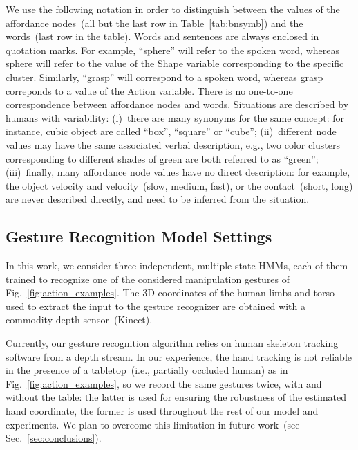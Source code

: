 We use the following notation in order to distinguish between the values of the affordance nodes~(all but the last row in Table~\ref{tab:bnsymb}) and the words~(last row in the table).
Words and sentences are always enclosed in quotation marks.
For example, ``sphere'' will refer to the spoken word, whereas sphere will refer to the value of the Shape variable corresponding to the specific cluster.
Similarly, ``grasp'' will correspond to a spoken word, whereas grasp correponds to a value of the Action variable.
There is no one-to-one correspondence between affordance nodes and words.
Situations are described by humans with variability:
(i)~there are many synonyms for the same concept: for instance, cubic object are called ``box'', ``square'' or ``cube'';
(ii)~different node values may have the same associated verbal description, e.g., two color clusters corresponding to different shades of green are both referred to as ``green'';
(iii)~finally, many affordance node values have no direct description: for example, the object velocity and \objecthand{} velocity~(slow, medium, fast), or the \objecthand{} contact~(short, long) are never described directly, and need to be inferred from the situation.

\subsection{Gesture Recognition Model Settings}
\label{sec:experimental_settings:gesture_recognition}
In this work, we consider three independent, multiple-state \aclp{HMM}, each of them trained to recognize one of the considered manipulation gestures of  Fig.~\ref{fig:action_examples}.
The 3D coordinates of the human limbs and torso used to extract the input to the gesture recognizer are obtained with a commodity depth sensor~(Kinect).

Currently, our gesture recognition algorithm relies on human skeleton tracking software from a depth stream.
In our experience, the hand tracking is not reliable in the presence of a tabletop~(i.e., partially occluded human) as in Fig.~\ref{fig:action_examples}, so we record the same gestures twice, with and without the table: the latter is used for ensuring the robustness of the estimated hand coordinate, the former is used throughout the rest of our model and experiments.
We plan to overcome this limitation in future work~(see Sec.~\ref{sec:conclusions}).

